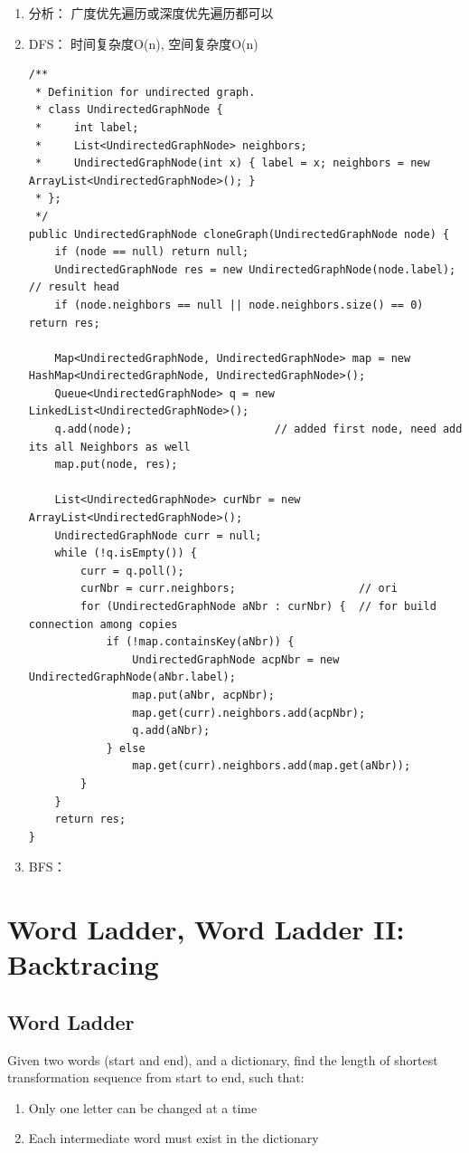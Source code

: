 \documentclass[11pt]{book}
\begin{document}
\begin{enumerate}
\item 分析： 广度优先遍历或深度优先遍历都可以
\label{sec-18-1-1-1}
\item DFS： 时间复杂度O(n), 空间复杂度O(n)
\label{sec-18-1-1-2}
\lstset{language=java,label= ,caption= ,numbers=none}
\begin{lstlisting}
/**
 * Definition for undirected graph.
 * class UndirectedGraphNode {
 *     int label;
 *     List<UndirectedGraphNode> neighbors;
 *     UndirectedGraphNode(int x) { label = x; neighbors = new ArrayList<UndirectedGraphNode>(); }
 * };
 */
public UndirectedGraphNode cloneGraph(UndirectedGraphNode node) {
    if (node == null) return null;
    UndirectedGraphNode res = new UndirectedGraphNode(node.label);  // result head
    if (node.neighbors == null || node.neighbors.size() == 0) return res;

    Map<UndirectedGraphNode, UndirectedGraphNode> map = new HashMap<UndirectedGraphNode, UndirectedGraphNode>();
    Queue<UndirectedGraphNode> q = new LinkedList<UndirectedGraphNode>();
    q.add(node);                      // added first node, need add its all Neighbors as well
    map.put(node, res);

    List<UndirectedGraphNode> curNbr = new ArrayList<UndirectedGraphNode>();
    UndirectedGraphNode curr = null;
    while (!q.isEmpty()) {
        curr = q.poll();
        curNbr = curr.neighbors;                   // ori
        for (UndirectedGraphNode aNbr : curNbr) {  // for build connection among copies
            if (!map.containsKey(aNbr)) {
                UndirectedGraphNode acpNbr = new UndirectedGraphNode(aNbr.label);
                map.put(aNbr, acpNbr);
                map.get(curr).neighbors.add(acpNbr);
                q.add(aNbr);
            } else
                map.get(curr).neighbors.add(map.get(aNbr));                        
        }
    }
    return res;
}
\end{lstlisting}
\item BFS：
\label{sec-18-1-1-3}
\end{enumerate}
\section{Word Ladder, Word Ladder II: Backtracing}
\label{sec-18-2}
\subsection{Word Ladder}
\label{sec-18-2-1}
Given two words (start and end), and a dictionary, find the length of shortest transformation sequence from start to end, such that:
\begin{enumerate}
\item Only one letter can be changed at a time
\item Each intermediate word must exist in the dictionary
\end{enumerate}
\end{document}
